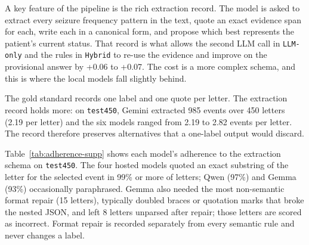 \documentclass[conference]{IEEEtran}
\begin{document}
A key feature of the pipeline is the rich extraction record. 
The model is asked to extract every seizure frequency pattern 
in the text, quote an exact evidence span for each, write each 
in a canonical form, and propose which best represents the 
patient's current status. That record is what allows the 
second LLM call in \texttt{LLM-only} and the rules in 
\texttt{Hybrid} to re-use the evidence and improve on the 
provisional answer by +0.06 to +0.07. The cost is a more 
complex schema, and this is where the local models fall 
slightly behind.

The gold standard records one label and one quote per letter. 
The extraction record holds more: on \texttt{test450}, Gemini 
extracted 985 events over 450 letters (2.19 per letter) and 
the six models ranged from 2.19 to 2.82 events per letter. 
The record therefore preserves 
alternatives that a one-label output would discard.

Table~\ref{tab:adherence-supp} shows each model's adherence 
to the extraction schema on \texttt{test450}. The four hosted 
models quoted an exact 
substring of the letter for the selected event in 99\% or more 
of letters; Qwen (97\%) and Gemma (93\%) occasionally 
paraphrased. Gemma also needed the most non-semantic format 
repair (15 letters), typically doubled braces or quotation 
marks that broke the nested JSON, and left 8 letters 
unparsed after repair; those letters are scored as incorrect. 
Format repair is recorded separately from every semantic 
rule and never changes a label.
\end{document}
